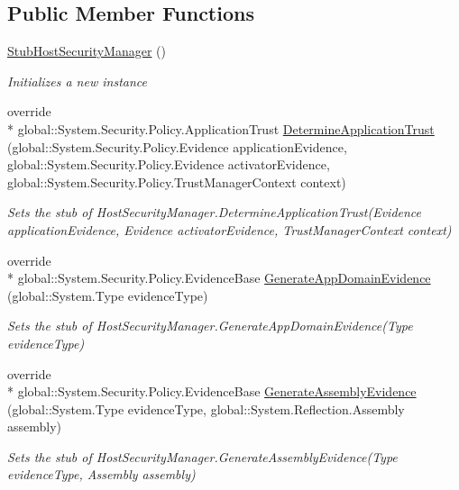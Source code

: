 \subsection*{Public Member Functions}
\begin{DoxyCompactItemize}
\item 
\hyperlink{class_system_1_1_security_1_1_fakes_1_1_stub_host_security_manager_aee7f197fd3ea2df876982ff277f24140}{Stub\-Host\-Security\-Manager} ()
\begin{DoxyCompactList}\small\item\em Initializes a new instance\end{DoxyCompactList}\item 
override \\*
global\-::\-System.\-Security.\-Policy.\-Application\-Trust \hyperlink{class_system_1_1_security_1_1_fakes_1_1_stub_host_security_manager_a018fb05c90120a574773af935141d211}{Determine\-Application\-Trust} (global\-::\-System.\-Security.\-Policy.\-Evidence application\-Evidence, global\-::\-System.\-Security.\-Policy.\-Evidence activator\-Evidence, global\-::\-System.\-Security.\-Policy.\-Trust\-Manager\-Context context)
\begin{DoxyCompactList}\small\item\em Sets the stub of Host\-Security\-Manager.\-Determine\-Application\-Trust(\-Evidence application\-Evidence, Evidence activator\-Evidence, Trust\-Manager\-Context context)\end{DoxyCompactList}\item 
override \\*
global\-::\-System.\-Security.\-Policy.\-Evidence\-Base \hyperlink{class_system_1_1_security_1_1_fakes_1_1_stub_host_security_manager_af810a83be8a06659774a9da5d68bd641}{Generate\-App\-Domain\-Evidence} (global\-::\-System.\-Type evidence\-Type)
\begin{DoxyCompactList}\small\item\em Sets the stub of Host\-Security\-Manager.\-Generate\-App\-Domain\-Evidence(\-Type evidence\-Type)\end{DoxyCompactList}\item 
override \\*
global\-::\-System.\-Security.\-Policy.\-Evidence\-Base \hyperlink{class_system_1_1_security_1_1_fakes_1_1_stub_host_security_manager_a8a4257211933a7bd9b2a6e3aa1eef018}{Generate\-Assembly\-Evidence} (global\-::\-System.\-Type evidence\-Type, global\-::\-System.\-Reflection.\-Assembly assembly)
\begin{DoxyCompactList}\small\item\em Sets the stub of Host\-Security\-Manager.\-Generate\-Assembly\-Evidence(\-Type evidence\-Type, Assembly assembly)\end{DoxyCompactList}\item 

\end{DoxyCompactItemize}

